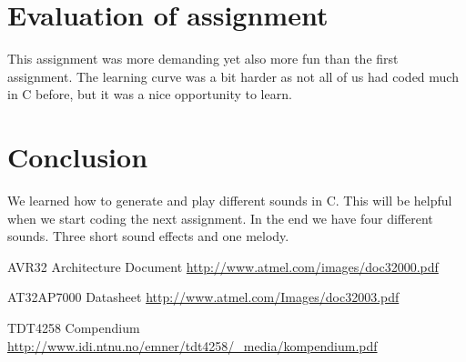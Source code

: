 \documentclass[a4paper,11pt]{article}
\begin{document}
\newpage

\section{Evaluation of assignment}
This assignment was more demanding yet also more fun than the first assignment. The learning curve was a bit harder as not all of us had coded much in C before, but it was a nice opportunity to learn.

\section{Conclusion}
We learned how to generate and play different sounds in C. This will be helpful when we start coding the next assignment. In the end we have four different sounds. Three short sound effects and one melody. 

\footnotesize{  %
\begin{thebibliography}{N}

 AVR32 Architecture Document
\url{http://www.atmel.com/images/doc32000.pdf}

 AT32AP7000 Datasheet
\url{http://www.atmel.com/Images/doc32003.pdf}

 TDT4258 Compendium
\url{http://www.idi.ntnu.no/emner/tdt4258/_media/kompendium.pdf}

\end{thebibliography}  
}
\end{document}
